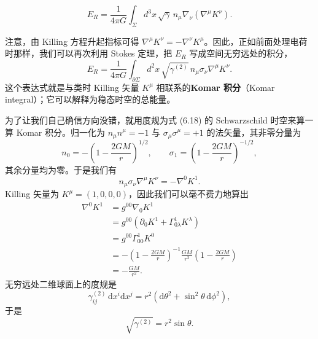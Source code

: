 \begin{equation*}
E_{R} = \frac{1}{4\pi G}\int_{\Sigma} d^{3}x\,\sqrt{\gamma}\, n_{\mu}\nabla_{\nu}\left(\nabla^{\mu}K^{\nu}\right).
\tag{6.37}
\end{equation*}

注意，由 Killing 方程升起指标可得 $\nabla^{\mu}K^{\nu}=-\nabla^{\nu}K^{\mu}$。因此，正如前面处理电荷时那样，我们可以再次利用 Stokes 定理，把 $E_{R}$ 写成空间无穷远处的积分，
\begin{equation*}
\boxed{\,E_{R} = \frac{1}{4\pi G}\int_{\partial\Sigma} d^{2}x\,\sqrt{\gamma^{(2)}}\, n_{\mu}\sigma_{\nu}\nabla^{\mu}K^{\nu}.\,}
\tag{6.38}
\end{equation*}
这个表达式就是与类时 Killing 矢量 $K^{\mu}$ 相联系的\textbf{Komar 积分}（Komar integral）；它可以解释为稳态时空的总能量。

为了让我们自己确信方向没错，就用度规为式 (6.18) 的 Schwarzschild 时空来算一算 Komar 积分。归一化为 $n_{\mu}n^{\mu}=-1$ 与 $\sigma_{\mu}\sigma^{\mu}=+1$ 的法矢量，其非零分量为
\begin{equation*}
n_{0} = -\left(1-\frac{2GM}{r}\right)^{1/2}, \qquad \sigma_{1} = \left(1-\frac{2GM}{r}\right)^{-1/2},
\tag{6.39}
\end{equation*}
其余分量均为零。于是我们有
\begin{equation*}
n_{\mu}\sigma_{\nu}\nabla^{\mu}K^{\nu} = -\nabla^{0}K^{1}.
\tag{6.40}
\end{equation*}
Killing 矢量为 $K^{\mu}=(1,0,0,0)$，因此我们可以毫不费力地算出
\begin{align*}
\nabla^{0}K^{1} &= g^{00}\nabla_{0}K^{1}\\
&= g^{00}\left(\partial_{0}K^{1}+\Gamma^{1}_{0\lambda}K^{\lambda}\right)\\
&= g^{00}\Gamma^{1}_{00}K^{0}\\
&= -\left(1-\frac{2GM}{r}\right)^{-1}\frac{GM}{r^{2}}\left(1-\frac{2GM}{r}\right)\\
&= -\frac{GM}{r^{2}}.
\tag{6.41}
\end{align*}
无穷远处二维球面上的度规是
\begin{equation*}
\gamma^{(2)}_{ij}\,\mathrm{d}x^{i}\mathrm{d}x^{j} = r^{2}\left(\mathrm{d}\theta^{2}+\sin^{2}\theta\,\mathrm{d}\phi^{2}\right),
\tag{6.42}
\end{equation*}
于是
\begin{equation*}
\sqrt{\gamma^{(2)}} = r^{2}\sin\theta.
\tag{6.43}
\end{equation*}

